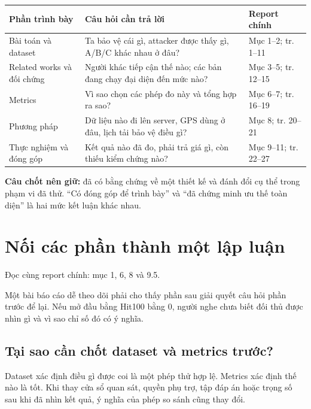 \documentclass[10pt,a4paper]{article}
\newcommand{\key}[1]{\par\smallskip\noindent\colorbox{pale}{\parbox{\dimexpr\linewidth-2\fboxsep}{#1}}\par\smallskip}
\newcommand{\where}[1]{\par{\small\color{gray}Đọc cùng report chính: #1.}\par}
\newcommand{\guidepage}[1]{\clearpage\section{#1}}
\begin{document}
\begin{longtable}{@{}P{4.0cm}P{8.7cm}P{3.5cm}@{}}
\toprule Phần trình bày & Câu hỏi cần trả lời & Report chính\\\midrule
Bài toán và dataset & Ta bảo vệ cái gì, attacker được thấy gì, A/B/C khác nhau ở đâu? & Mục 1--2; tr. 1--11\\[3pt]
Related works và đối chứng & Người khác tiếp cận thế nào; các bản đang chạy đại diện đến mức nào? & Mục 3--5; tr. 12--15\\[3pt]
Metrics & Vì sao chọn các phép đo này và tổng hợp ra sao? & Mục 6--7; tr. 16--19\\[3pt]
Phương pháp & Dữ liệu nào đi lên server, GPS dùng ở đâu, lịch tải bảo vệ điều gì? & Mục 8; tr. 20--21\\[3pt]
Thực nghiệm và đóng góp & Kết quả nào đã đo, phải trả giá gì, còn thiếu kiểm chứng nào? & Mục 9--11; tr. 22--27\\
\bottomrule
\end{longtable}
\key{\textbf{Câu chốt nên giữ:} đã có bằng chứng về một thiết kế và đánh đổi cụ thể trong phạm vi đã thử. ``Có đóng góp để trình bày'' và ``đã chứng minh ưu thế toàn diện'' là hai mức kết luận khác nhau.}

\guidepage{Nối các phần thành một lập luận}
\where{mục 1, 6, 8 và 9.5}
Một bài báo cáo dễ theo dõi phải cho thấy phần sau giải quyết câu hỏi phần trước để lại. Nếu mở đầu bằng Hit100 bằng 0, người nghe chưa biết đối thủ được nhìn gì và vì sao chỉ số đó có ý nghĩa.

\begin{center}
\end{center}

\subsection*{Tại sao cần chốt dataset và metrics trước?}
Dataset xác định điều gì được coi là một phép thử hợp lệ. Metrics xác định thế nào là tốt. Khi thay cửa sổ quan sát, quyền phụ trợ, tập đáp án hoặc trọng số sau khi đã nhìn kết quả, ý nghĩa của phép so sánh cũng thay đổi.
\end{document}
